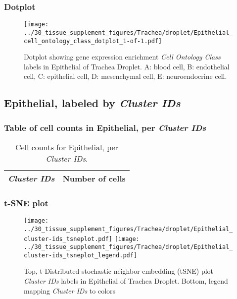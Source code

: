 \clearpage

\subsubsection{Dotplot}
\begin{figure}[h]
\centering
\texttt{[image: ../30\_tissue\_supplement\_figures/Trachea/droplet/Epithelial\_cell\_ontology\_class\_dotplot\_1-of-1.pdf]}

\caption{ Dotplot  showing gene expression enrichment \emph{Cell Ontology Class} labels in Epithelial of Trachea Droplet. A: blood cell, B: endothelial cell, C: epithelial cell, D: mesenchymal cell, E: neuroendocrine cell.}
\end{figure}


\clearpage

\subsection{Epithelial, labeled by \emph{Cluster IDs}}
\subsubsection{Table of cell counts in Epithelial, per \emph{Cluster IDs}}\begin{table}[h]
\centering
\label{my-label}
\begin{tabular}{@{}ll@{}}
\toprule

\emph{Cluster IDs}& Number of cells \\ \midrule\bottomrule
\end{tabular}
\caption{Cell counts for Epithelial, per \emph{Cluster IDs}.}
\end{table}

\clearpage
\subsubsection{t-SNE plot}
\begin{figure}[h]
\centering
\texttt{[image: ../30\_tissue\_supplement\_figures/Trachea/droplet/Epithelial\_cluster-ids\_tsneplot.pdf]}
\texttt{[image: ../30\_tissue\_supplement\_figures/Trachea/droplet/Epithelial\_cluster-ids\_tsneplot\_legend.pdf]}
\caption{Top, t-Distributed stochastic neighbor embedding (tSNE) plot  \emph{Cluster IDs} labels in Epithelial of Trachea Droplet. Bottom, legend mapping \emph{Cluster IDs} to colors}
\end{figure}


